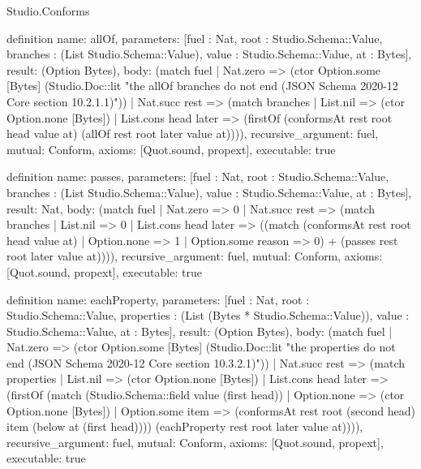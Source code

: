 \begin{lexlean}{Studio.Conforms}
\begin{semanticmodule}
definition{
  name: allOf,
  parameters: [fuel : Nat, root : Studio.Schema::Value, branches : (List Studio.Schema::Value), value : Studio.Schema::Value, at : Bytes],
  result: (Option Bytes),
  body: (match fuel
    | Nat.zero => (ctor Option.some [Bytes] (Studio.Doc::lit "the allOf branches do not end (JSON Schema 2020-12 Core section 10.2.1.1)"))
    | Nat.succ rest => (match branches
      | List.nil => (ctor Option.none [Bytes])
      | List.cons head later => (firstOf (conformsAt rest root head value at) (allOf rest root later value at)))),
  recursive_argument: fuel,
  mutual: Conform,
  axioms: [Quot.sound, propext],
  executable: true
}

definition{
  name: passes,
  parameters: [fuel : Nat, root : Studio.Schema::Value, branches : (List Studio.Schema::Value), value : Studio.Schema::Value, at : Bytes],
  result: Nat,
  body: (match fuel
    | Nat.zero => 0
    | Nat.succ rest => (match branches
      | List.nil => 0
      | List.cons head later => ((match (conformsAt rest root head value at)
        | Option.none => 1
        | Option.some reason => 0) + (passes rest root later value at)))),
  recursive_argument: fuel,
  mutual: Conform,
  axioms: [Quot.sound, propext],
  executable: true
}

definition{
  name: eachProperty,
  parameters: [fuel : Nat, root : Studio.Schema::Value, properties : (List (Bytes * Studio.Schema::Value)), value : Studio.Schema::Value, at : Bytes],
  result: (Option Bytes),
  body: (match fuel
    | Nat.zero => (ctor Option.some [Bytes] (Studio.Doc::lit "the properties do not end (JSON Schema 2020-12 Core section 10.3.2.1)"))
    | Nat.succ rest => (match properties
      | List.nil => (ctor Option.none [Bytes])
      | List.cons head later => (firstOf (match (Studio.Schema::field value (first head))
        | Option.none => (ctor Option.none [Bytes])
        | Option.some item => (conformsAt rest root (second head) item (below at (first head)))) (eachProperty rest root later value at)))),
  recursive_argument: fuel,
  mutual: Conform,
  axioms: [Quot.sound, propext],
  executable: true
}


\end{semanticmodule}
\end{lexlean}
